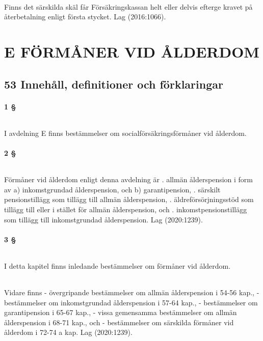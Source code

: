 \documentclass[a4paper,notitlepage,openany,10pt]{book}
\begin{document}
\paragraph*{}
Finns det särskilda skäl får Försäkringskassan helt eller delvis efterge kravet på återbetalning enligt första stycket.
Lag (2016:1066).
\part*{E FÖRMÅNER VID ÅLDERDOM}
\chapter*{53 Innehåll, definitioner och förklaringar}
\subsection*{1 §}
\paragraph*{}
I avdelning E finns bestämmelser om socialförsäkringsförmåner vid ålderdom.
\subsection*{2 §}
\paragraph*{}
Förmåner vid ålderdom enligt denna avdelning är
. allmän ålderspension i form av
a) inkomstgrundad ålderspension, och
b) garantipension,
. särskilt pensionstillägg som tillägg till allmän ålderspension,
. äldreförsörjningsstöd som tillägg till eller i stället för allmän ålderspension, och
. inkomstpensionstillägg som tillägg till inkomstgrundad ålderspension.
Lag (2020:1239).
\subsection*{3 §}
\paragraph*{}
I detta kapitel finns inledande bestämmelser om förmåner vid ålderdom.
\paragraph*{}
Vidare finns
\newline - övergripande bestämmelser om allmän ålderspension i 54-56 kap.,
\newline - bestämmelser om inkomstgrundad ålderspension i 57-64 kap.,
\newline - bestämmelser om garantipension i 65-67 kap.,
\newline - vissa gemensamma bestämmelser om allmän ålderspension i 68-71 kap., och
\newline - bestämmelser om särskilda förmåner vid ålderdom i 72-74 a kap.
Lag (2020:1239).
\end{document}
